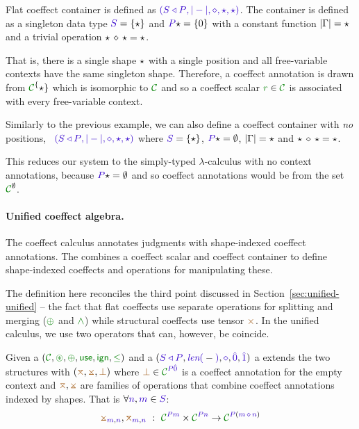 \begin{example}
\label{ex:unified-flat-shape}
Flat coeffect container is defined as $\sclrd{(\SHP, {|}-{|}, \diamond, \sflat, \sflat)}$.
The container is defined as a singleton data type $\SH = \{\sflat \}$ and $\SP \sflat = \{ 0 \}$
with a constant function ${|}\Gamma{|}=\star$ and a trivial operation $\star\,\diamond\,\star = \star$. 

That is, there is a single shape
$\star$ with a single position and all free-variable contexts have the same singleton shape.
Therefore, a coeffect annotation is drawn from $\C^\{\sflat\}$ which is isomorphic to $\C$
and so a coeffect scalar $\cclrd{r}\in \C$ is associated with every free-variable context.
\end{example}

\newpage
\begin{example}
Similarly to the previous example, we can also define a coeffect container with \emph{no} positions,
\ie~$\sclrd{(\SHP, {|}-{|}, \diamond, \sflat, \sflat)}$ where $\SH = \{\sflat \}$, $\SP \sflat = \emptyset$,
${|}\Gamma{|}=\star$ and $\star\,\diamond\,\star = \star$. 

This reduces our system to the simply-typed $\lambda$-calculus with no context annotations, because
$\SP\sflat=\emptyset$ and so coeffect annotations would be from the set $\C^\emptyset$.
\end{example}


\paragraph{Unified coeffect algebra.}
The coeffect calculus annotates judgments with shape-indexed coeffect annotations.
The \emph{} combines a coeffect scalar and coeffect container
to define shape-indexed coeffects and operations for manipulating these. 

The definition here reconciles the third point discussed in Section~\ref{sec:unified-unified} --
the fact that flat coeffects use separate operations for splitting and merging ($\cpar$ and $\czip$)
while structural coeffects use tensor $\atimes$. In the unified calculus, we use two operators
that can, however, be coincide.

\begin{definition}
Given a  $(\C, \cseq, \cpar, \cunit, \czero, \cleq)$ and a 
 $(\SHP, \slen{-}, \stimes, \sempty, \sunit)$ a \emph{} extends the two structures with $(\azip, \apar, \azero)$ where $\azero \in \C^{\SP \sempty}$
is a coeffect annotation for the empty context and $\azip, \apar$ are families of operations that 
combine coeffect annotations indexed by shapes. That is $\forall \sclrd{n},\sclrd{m} \in \SH$:
%
\begin{equation*}
\apar_{\sclrd{m},\sclrd{n}}, \azip_{\sclrd{m},\sclrd{n}} ~:~ \C^{\SP \sclrd{m}} \times \C^{\SP \sclrd{n}} \rightarrow \C^{\SP (\sclrd{m}\,\stimes\,\sclrd{n})}
\end{equation*}
\end{definition}

